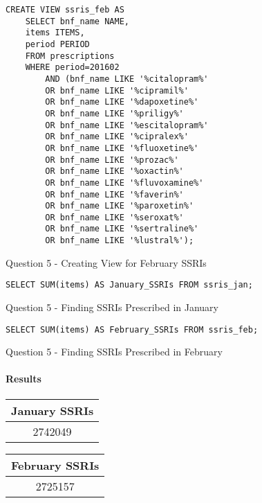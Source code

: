 \documentclass{report}
\begin{document}
\begin{listing}[H]
\begin{verbatim}
CREATE VIEW ssris_feb AS 
	SELECT bnf_name NAME, 
	items ITEMS, 
	period PERIOD 
	FROM prescriptions 
	WHERE period=201602 
		AND (bnf_name LIKE '%citalopram%' 
		OR bnf_name LIKE '%cipramil%' 
		OR bnf_name LIKE '%dapoxetine%' 
		OR bnf_name LIKE '%priligy%' 
		OR bnf_name LIKE '%escitalopram%' 
		OR bnf_name LIKE '%cipralex%' 
		OR bnf_name LIKE '%fluoxetine%' 
		OR bnf_name LIKE '%prozac%' 
		OR bnf_name LIKE '%oxactin%' 
		OR bnf_name LIKE '%fluvoxamine%' 
		OR bnf_name LIKE '%faverin%' 
		OR bnf_name LIKE '%paroxetin%' 
		OR bnf_name LIKE '%seroxat%' 
		OR bnf_name LIKE '%sertraline%' 
		OR bnf_name LIKE '%lustral%');
\end{verbatim}
\caption{Question 5 - Creating View for February SSRIs}
\label{lst: Q5-2}
\end{listing}

\begin{listing}[H]
\begin{verbatim}
SELECT SUM(items) AS January_SSRIs FROM ssris_jan;
\end{verbatim}
\caption{Question 5 - Finding SSRIs Prescribed in January}
\label{lst: Q5-3}
\end{listing}

\begin{listing}[H]
\begin{verbatim}
SELECT SUM(items) AS February_SSRIs FROM ssris_feb;
\end{verbatim}
\caption{Question 5 - Finding SSRIs Prescribed in February}
\label{lst: Q5-4}
\end{listing}

\paragraph{Results}
\begin{center}
\begin{tabular}{ | c | }
\hline
January SSRIs \\
\hline
2742049\\
\hline
\end{tabular}
\end{center}

\begin{center}
\begin{tabular}{ | c | }
\hline
February SSRIs \\
\hline
2725157 \\
\hline
\end{tabular}
\end{center}
\end{document}
